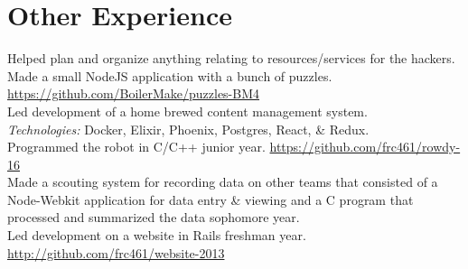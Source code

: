 \documentclass[11pt,letter,sans]{moderncv}
\begin{document}
\section{Other Experience}
Helped plan and organize anything relating to resources/services for the hackers.
Made a small NodeJS application with a bunch of puzzles. \url{https://github.com/BoilerMake/puzzles-BM4}
\\
Led development of a home brewed content management system.
\\
\textit{Technologies:} Docker, Elixir, Phoenix, Postgres, React, \& Redux.
\\
Programmed the robot in C/C++ junior year.
\url{https://github.com/frc461/rowdy-16}
\\
Made a scouting system for recording data on other teams that consisted of a Node-Webkit application for data entry \& viewing and a C program that processed and summarized the data sophomore year.
\\
Led development on a website in Rails freshman year. \url{http://github.com/frc461/website-2013}
\\
\end{document}
